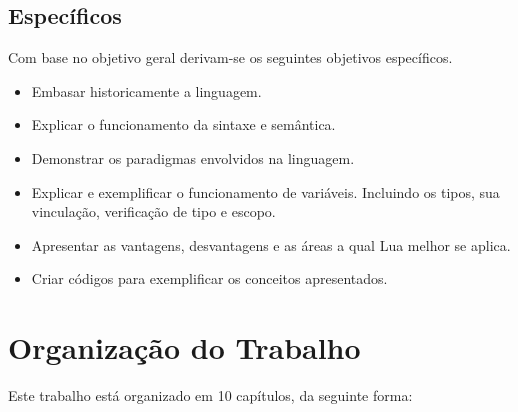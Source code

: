 \documentclass[
12pt, %
openright, %
oneside, %
a4paper, %
english, %
brazil, %
]{abntex2}
\begin{document}
\subsection{Específicos}
Com base no objetivo geral derivam-se os seguintes objetivos específicos.
\begin{itemize}
\item Embasar historicamente a linguagem.
\item Explicar o funcionamento da sintaxe e semântica.
\item Demonstrar os paradigmas envolvidos na linguagem.
\item Explicar e exemplificar o funcionamento de variáveis. Incluindo os tipos, sua vinculação, verificação de tipo e escopo.
\item Apresentar as vantagens, desvantagens e as áreas a qual Lua melhor se aplica.
\item Criar códigos para exemplificar os conceitos apresentados.
\end{itemize}

\section{Organização do Trabalho}
Este trabalho está organizado em 10 capítulos, da seguinte forma:
\end{document}
